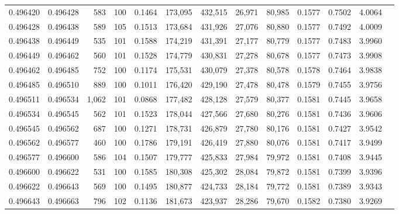 \begin{tabular}{rrrrrrrrrrrrr}
0.496420 & 0.496428 &   583 & 100 &                                     0.1464 & 173,095 & 432,515 &  26,971 &  80,985 & 0.1577 & 0.7502 & 4.0064 \\
0.496428 & 0.496438 &   589 & 105 &                                     0.1513 & 173,684 & 431,926 &  27,076 &  80,880 & 0.1577 & 0.7492 & 4.0009 \\
0.496438 & 0.496449 &   535 & 101 &                                     0.1588 & 174,219 & 431,391 &  27,177 &  80,779 & 0.1577 & 0.7483 & 3.9960 \\
0.496449 & 0.496462 &   560 & 101 &                                     0.1528 & 174,779 & 430,831 &  27,278 &  80,678 & 0.1577 & 0.7473 & 3.9908 \\
0.496462 & 0.496485 &   752 & 100 &                                     0.1174 & 175,531 & 430,079 &  27,378 &  80,578 & 0.1578 & 0.7464 & 3.9838 \\
0.496485 & 0.496510 &   889 & 100 &                                     0.1011 & 176,420 & 429,190 &  27,478 &  80,478 & 0.1579 & 0.7455 & 3.9756 \\
0.496511 & 0.496534 & 1,062 & 101 &                                     0.0868 & 177,482 & 428,128 &  27,579 &  80,377 & 0.1581 & 0.7445 & 3.9658 \\
0.496534 & 0.496545 &   562 & 101 &                                     0.1523 & 178,044 & 427,566 &  27,680 &  80,276 & 0.1581 & 0.7436 & 3.9606 \\
0.496545 & 0.496562 &   687 & 100 &                                     0.1271 & 178,731 & 426,879 &  27,780 &  80,176 & 0.1581 & 0.7427 & 3.9542 \\
0.496562 & 0.496577 &   460 & 100 &                                     0.1786 & 179,191 & 426,419 &  27,880 &  80,076 & 0.1581 & 0.7417 & 3.9499 \\
0.496577 & 0.496600 &   586 & 104 &                                     0.1507 & 179,777 & 425,833 &  27,984 &  79,972 & 0.1581 & 0.7408 & 3.9445 \\
0.496600 & 0.496622 &   531 & 100 &                                     0.1585 & 180,308 & 425,302 &  28,084 &  79,872 & 0.1581 & 0.7399 & 3.9396 \\
0.496622 & 0.496643 &   569 & 100 &                                     0.1495 & 180,877 & 424,733 &  28,184 &  79,772 & 0.1581 & 0.7389 & 3.9343 \\
0.496643 & 0.496663 &   796 & 102 &                                     0.1136 & 181,673 & 423,937 &  28,286 &  79,670 & 0.1582 & 0.7380 & 3.9269 \\

\end{tabular}

